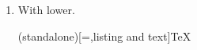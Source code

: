 \begin{enumerate}
\begin{enumerate}
\begin{code}
        \end{code}
        \item With lower.
        \begin{code}(standalone)[=,listing and text]{\TeX}


















































        \end{code}
    \end{enumerate}
\end{enumerate}